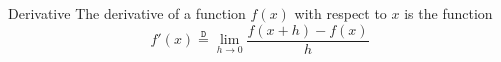 \documentclass[preview]{standalone}
\begin{document}
\begin{defn*}{Derivative}
  The derivative of a function $f\left(x\right)$ with respect to $x$ is the function
  \[
  f\prime\left(x\right) \stackrel{\mathtt{D}}{=} \lim_{h\to 0} \frac{f\left(x  +  h\right)  -  f\left(x\right)}{h}
  \]
\end{defn*}
\end{document}
